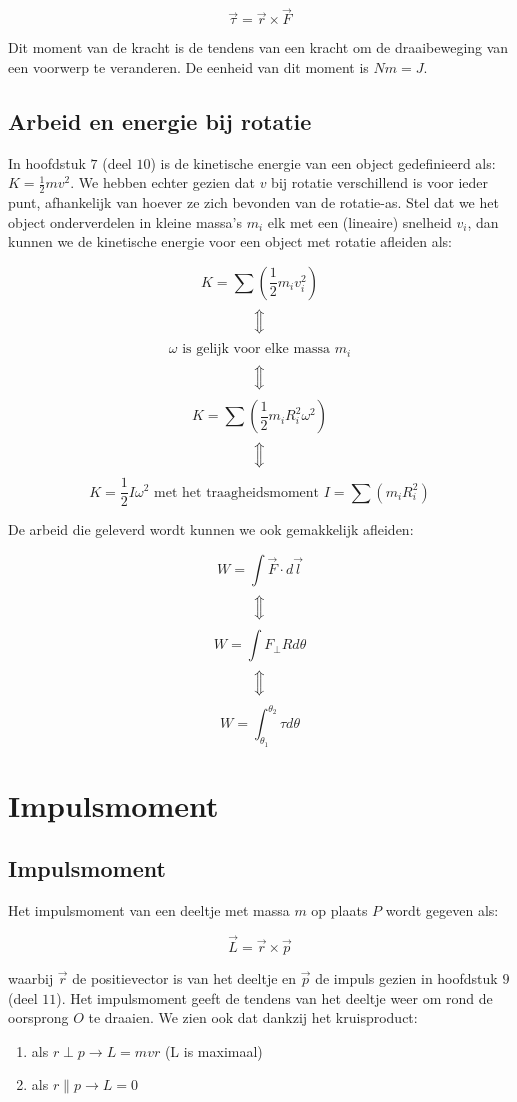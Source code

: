 \documentclass[12pt,a4paper]{article}
\newcommand{\Luda}{\Big\Updownarrow}
\begin{document}
    $$\vec{\tau} = \vec{r} \times \vec{F}$$
    
    Dit moment van de kracht is de tendens van een kracht om de draaibeweging van een voorwerp
    te veranderen.  De eenheid van dit moment is $Nm = J$. 
    
    \subsection{Arbeid en energie bij rotatie}
    In hoofdstuk $7$ (deel $10$) is de kinetische energie van een object gedefinieerd als: $K = \frac{1}{2}mv^{2}$. We
    hebben echter gezien dat $v$ bij rotatie verschillend is voor ieder punt, afhankelijk van hoever ze zich bevonden van
    de rotatie-as. Stel dat we het object onderverdelen in kleine massa's $m_i$ elk met een (lineaire) snelheid $v_i$, dan kunnen
    we de kinetische energie voor een object met rotatie afleiden als:
    
    $$K = \sum \left( \frac{1}{2} m_{i} v_{i}^{2}\right)$$
    $$\Luda$$
    $$\omega \textrm{ is gelijk voor elke massa } m_{i}$$
    $$\Luda$$
    $$K = \sum \left( \frac{1}{2} m_{i} R_{i}^{2}\omega^{2}\right)$$
    $$\Luda$$
    $$K = \frac{1}{2} I\omega^{2} \textrm{ met het traagheidsmoment } I = \sum \left(m_{i} R_{i}^{2}\right)$$
    
    De arbeid die geleverd wordt kunnen we ook gemakkelijk afleiden:
    
    $$W = \int \vec{F} \cdot d\vec{l}$$
    $$\Luda$$
    $$W = \int F_{\perp}Rd\theta$$
    $$\Luda$$
    $$W = \int_{\theta_{1}}^{\theta_{2}} \tau d\theta$$

    \section{Impulsmoment}
    \subsection{Impulsmoment}
    Het impulsmoment van een deeltje met massa $m$ op plaats $P$ wordt gegeven als:
    
    $$\vec{L} = \vec{r} \times \vec{p}$$
    
    waarbij $\vec{r}$ de positievector is van het deeltje en $\vec{p}$ de impuls gezien in hoofdstuk $9$ (deel $11$).
    Het impulsmoment geeft de tendens van het deeltje weer om rond de oorsprong $O$ te draaien. We zien ook dat dankzij
    het kruisproduct:
    
    \begin{enumerate}
    	\item als $r \perp p \to L = mvr$ (L is maximaal)
    	\item als $r \parallel p \to L = 0$
   \end{enumerate}
   
\end{document}
